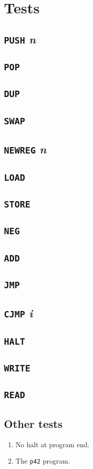 \section{Tests}
\subsection{\texttt{PUSH} \textit{n}}
\subsection{\texttt{POP}}
\subsection{\texttt{DUP}}
\subsection{\texttt{SWAP}}
\subsection{\texttt{NEWREG} \textit{n}}
\subsection{\texttt{LOAD}}
\subsection{\texttt{STORE}}
\subsection{\texttt{NEG}}
\subsection{\texttt{ADD}}
\subsection{\texttt{JMP}}
\subsection{\texttt{CJMP} \textit{i}}
\subsection{\texttt{HALT}}
\subsection{\texttt{WRITE}}
\subsection{\texttt{READ}}
\subsection{Other tests}
\begin{enumerate}
  \item No halt at program end.
  \item The \texttt{p42} program.
\end{enumerate}